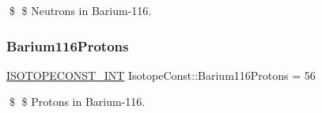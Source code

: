 \$ \$ Neutrons in Barium-\/116. \mbox{\label{group___isotope_const-_barium-_ba116_ga08dc4d122adeca65d98f51d4103d0cdd}} 
\subsubsection{\texorpdfstring{Barium116\+Protons}{Barium116Protons}}
{\footnotesize\ttfamily \mbox{\hyperlink{group___isotope_const-_macros_ga5f18360b3e99483a35c32d789e62621c}{I\+S\+O\+T\+O\+P\+E\+C\+O\+N\+S\+T\+\_\+\+I\+NT}} Isotope\+Const\+::\+Barium116\+Protons = 56}

\$ \$ Protons in Barium-\/116. 